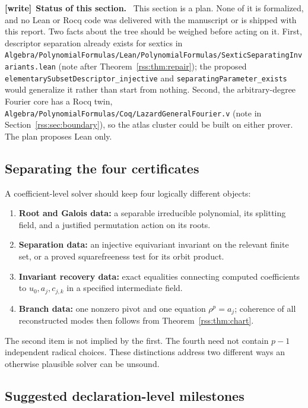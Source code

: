\documentclass[11pt,a4paper]{article}
\theoremstyle{definition}
\theoremstyle{remark}
\newcommand{\code}[1]{{\small\nolinkurl{#1}}}
\newenvironment{writenote}[1][]{\par\smallskip\begingroup\small
 \noindent\textbf{[write]}\if\relax\detokenize{#1}\relax\else~\textbf{#1.}\fi\ }%
 {\par\endgroup\smallskip}
\newcommand{\repo}[1]{\code{#1}}
\begin{document}
\begin{writenote}[Status of this section]
This section is a plan. None of it is formalized, and no Lean or Rocq code
was delivered with the manuscript or is shipped with this report. Two facts
about the tree should be weighed before acting on it. First, descriptor
separation already exists for sextics in
\repo{Algebra/PolynomialFormulas/Lean/PolynomialFormulas/SexticSeparatingInvariants.lean}
(note after Theorem~\ref{rss:thm:repair}); the proposed
\code{elementarySubsetDescriptor_injective} and
\code{separatingParameter_exists} would generalize it rather than start from
nothing. Second, the arbitrary-degree Fourier core has a Rocq twin,
\repo{Algebra/PolynomialFormulas/Coq/LazardGeneralFourier.v} (note in
Section~\ref{rss:sec:boundary}), so
the atlas cluster could be built on either prover. The plan proposes Lean
only.
\end{writenote}

\subsection{Separating the four certificates}

A coefficient-level solver should keep four logically different objects:
\begin{enumerate}[label=(\arabic*)]
\item \textbf{Root and Galois data:} a separable irreducible polynomial, its
splitting field, and a justified permutation action on its roots.
\item \textbf{Separation data:} an injective equivariant invariant on the
relevant finite set, or a proved squarefreeness test for its orbit product.
\item \textbf{Invariant recovery data:} exact equalities connecting computed
coefficients to $u_0,a_j,c_{j,k}$ in a specified intermediate field.
\item \textbf{Branch data:} one nonzero pivot and one equation
$\rho^p=a_j$; coherence of all reconstructed modes then follows from
Theorem~\ref{rss:thm:chart}.
\end{enumerate}
The second item is not implied by the first. The fourth need not contain
$p-1$ independent radical choices. These distinctions address two different
ways an otherwise plausible solver can be unsound.

\subsection{Suggested declaration-level milestones}
\end{document}

